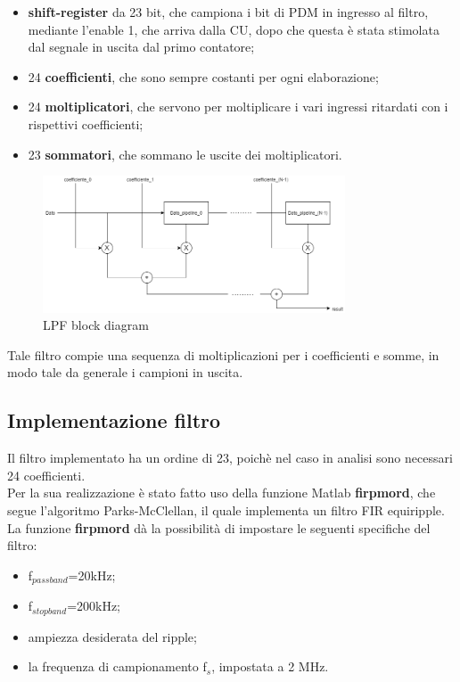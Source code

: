 \documentclass[a4paper, titlepage]{article}
\begin{document}
\begin{itemize}
    \item \textbf{shift-register} da 23 %
    bit, che campiona i bit di PDM in ingresso al filtro, mediante l'enable 1, che arriva dalla CU, dopo che questa è stata stimolata dal segnale in uscita dal primo contatore;
    \item 24 \textbf{coefficienti}, che sono sempre costanti per ogni elaborazione; 
    \item 24 \textbf{moltiplicatori}, che servono per moltiplicare i vari ingressi ritardati con i rispettivi coefficienti;
    \item 23 \textbf{sommatori}, che sommano le uscite dei moltiplicatori.
\end{itemize}
\begin{figure}[H]
\centering
\includegraphics[width=0.8\textwidth]{fir.png} 
\caption{LPF block diagram}
\label{fig:LPF}
\end{figure}
Tale filtro compie una sequenza di moltiplicazioni per i coefficienti e somme, in modo tale da generale i campioni in uscita. 
\subsection{Implementazione filtro}
Il filtro implementato ha un ordine di 23, poichè nel caso in analisi sono necessari 24 coefficienti.\\Per la sua realizzazione è stato fatto uso della funzione Matlab \textbf{firpmord}, che segue l'algoritmo Parks-McClellan, il quale implementa un filtro FIR equiripple.\\La funzione \textbf{firpmord} dà la possibilità di impostare le seguenti specifiche del filtro:

\begin{itemize}
    \item f$_{passband}$=20kHz;
    \item f$_{stopband}$=200kHz;
    \item ampiezza desiderata del ripple;
    \item la frequenza di campionamento f$_{s}$, impostata a 2 MHz.
\end{itemize}
\end{document}

